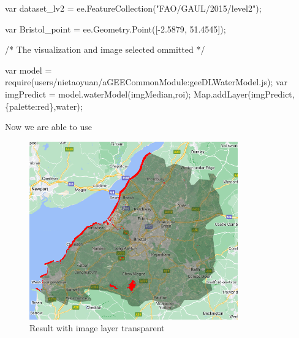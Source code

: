 \documentclass[
  letterpaper,
  DIV=11,
  numbers=noendperiod]{scrreprt}
\newenvironment{Shaded}{\begin{snugshade}}{\end{snugshade}}
\newcommand{\AttributeTok}[1]{\textcolor[rgb]{0.40,0.45,0.13}{#1}}
\newcommand{\BuiltInTok}[1]{\textcolor[rgb]{0.00,0.23,0.31}{#1}}
\newcommand{\CommentTok}[1]{\textcolor[rgb]{0.37,0.37,0.37}{#1}}
\newcommand{\FloatTok}[1]{\textcolor[rgb]{0.68,0.00,0.00}{#1}}
\newcommand{\FunctionTok}[1]{\textcolor[rgb]{0.28,0.35,0.67}{#1}}
\newcommand{\KeywordTok}[1]{\textcolor[rgb]{0.00,0.23,0.31}{#1}}
\newcommand{\NormalTok}[1]{\textcolor[rgb]{0.00,0.23,0.31}{#1}}
\newcommand{\OperatorTok}[1]{\textcolor[rgb]{0.37,0.37,0.37}{#1}}
\newcommand{\PreprocessorTok}[1]{\textcolor[rgb]{0.68,0.00,0.00}{#1}}
\newcommand{\StringTok}[1]{\textcolor[rgb]{0.13,0.47,0.30}{#1}}
\begin{document}
\begin{Shaded}
\begin{Highlighting}[]
\KeywordTok{var}\NormalTok{ dataset\_lv2 }\OperatorTok{=}\NormalTok{ ee}\OperatorTok{.}\FunctionTok{FeatureCollection}\NormalTok{(}\StringTok{"FAO/GAUL/2015/level2"}\NormalTok{)}\OperatorTok{;}

\KeywordTok{var}\NormalTok{ Bristol\_point }\OperatorTok{=}\NormalTok{ ee}\OperatorTok{.}\AttributeTok{Geometry}\OperatorTok{.}\FunctionTok{Point}\NormalTok{([}\OperatorTok{{-}}\FloatTok{2.5879}\OperatorTok{,} \FloatTok{51.4545}\NormalTok{])}\OperatorTok{;}

\CommentTok{/*}
\CommentTok{The visualization and image selected ommitted}
\CommentTok{*/}

\KeywordTok{var}\NormalTok{ model }\OperatorTok{=} \PreprocessorTok{require}\NormalTok{(}\StringTok{\textquotesingle{}users/nietaoyuan/aGEECommonModule:geeDLWaterModel.js\textquotesingle{}}\NormalTok{)}\OperatorTok{;}
\KeywordTok{var}\NormalTok{ imgPredict }\OperatorTok{=}\NormalTok{ model}\OperatorTok{.}\FunctionTok{waterModel}\NormalTok{(imgMedian}\OperatorTok{,}\NormalTok{roi)}\OperatorTok{;}
\BuiltInTok{Map}\OperatorTok{.}\FunctionTok{addLayer}\NormalTok{(imgPredict}\OperatorTok{,}\NormalTok{\{}\StringTok{\textquotesingle{}palette\textquotesingle{}}\OperatorTok{:}\StringTok{\textquotesingle{}red\textquotesingle{}}\NormalTok{\}}\OperatorTok{,}\StringTok{\textquotesingle{}water\textquotesingle{}}\NormalTok{)}\OperatorTok{;}
\end{Highlighting}
\end{Shaded}

Now we are able to use

\begin{figure}

{\centering \includegraphics[width=3.54167in,height=3.02083in]{images/wk8/result1_bristol_water.png}

}

\caption{Result with image layer transparent}

\end{figure}
\end{document}
